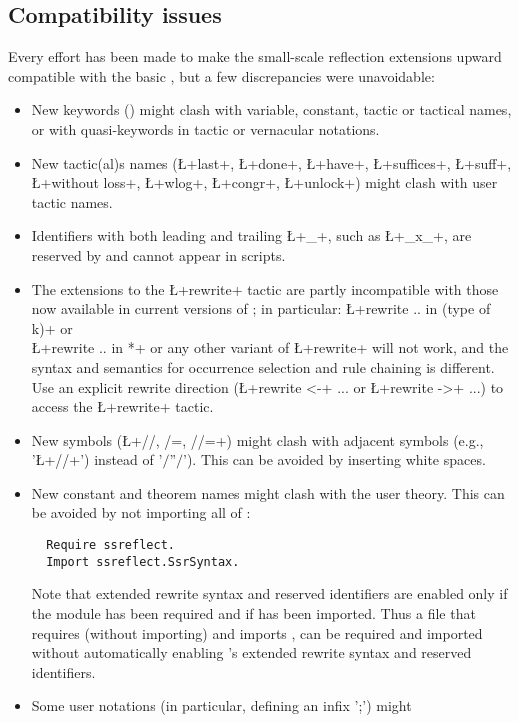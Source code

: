 \subsection{Compatibility issues}\label{sec:compat}
Every effort has been made to make the small-scale reflection
extensions upward compatible with the basic \Coq{}, but a few
discrepancies were unavoidable:
\begin{itemize}
\item New keywords () might clash with variable, constant,
tactic or tactical names, or with quasi-keywords in tactic or
vernacular notations.
\item New tactic(al)s names (\L+last+, \L+done+, \L+have+,
  \L+suffices+, \L+suff+,
  \L+without loss+, \L+wlog+, \L+congr+, \L+unlock+) might clash
  with user tactic names.
\item Identifiers with both leading and trailing \L+_+, such as \L+_x_+,
are reserved by \ssr{} and cannot appear in scripts.
\item The extensions to the \L+rewrite+ tactic are partly
incompatible with those now available in current versions of \Coq{};
in particular:
\L+rewrite .. in (type of k)+ or \\ \L+rewrite .. in *+ or any other
variant of \L+rewrite+ will not work, and the \ssr{} syntax and semantics for occurrence selection and
rule chaining is different.
Use an explicit rewrite direction (\L+rewrite <-+ ... or \L+rewrite ->+ ...)
to access the \Coq{} \L+rewrite+ tactic.
\item New symbols (\L+//, /=, //=+) might clash with adjacent symbols
(e.g., '\L+//+') instead of '$/$''$/$'). This can be avoided by
inserting white spaces.
\item New constant and theorem names might clash with the user
theory. This can be avoided by not importing all of \ssr{}:
\begin{lstlisting}
  Require ssreflect.
  Import ssreflect.SsrSyntax.
\end{lstlisting}
Note that \ssr{} extended rewrite syntax and reserved identifiers are
enabled only if the  module has been required and if
 has been imported. Thus a file that requires (without importing)
  and imports , can be
required and imported without automatically enabling \ssr{}'s
extended rewrite syntax and reserved identifiers.
\item Some user notations (in particular, defining an infix ';') might

\end{itemize}
